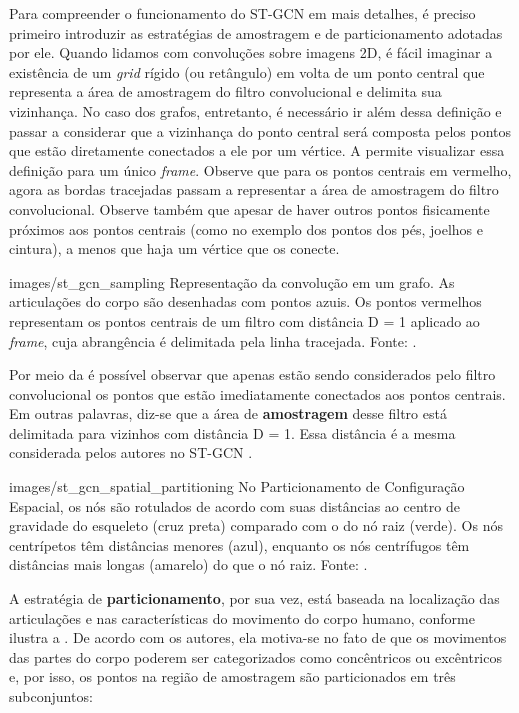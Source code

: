 Para compreender o funcionamento do ST-GCN em mais detalhes, é preciso primeiro introduzir as estratégias de amostragem e de particionamento adotadas por ele. Quando lidamos com convoluções sobre imagens 2D, é fácil imaginar a existência de um \textit{grid} rígido (ou retângulo) em volta de um ponto central que representa a área de amostragem do filtro convolucional e delimita sua vizinhança. No caso dos grafos, entretanto, é necessário ir além dessa definição e passar a considerar que a vizinhança do ponto central será composta pelos pontos que estão diretamente conectados a ele por um vértice. A  permite visualizar essa definição para um único \textit{frame}. Observe que para os pontos centrais em vermelho, agora as bordas tracejadas passam a representar a área de amostragem do filtro convolucional. Observe também que apesar de haver outros pontos fisicamente próximos aos pontos centrais (como no exemplo dos pontos dos pés, joelhos e cintura), a menos que haja um vértice que os conecte.

    {images/st_gcn_sampling}
    {Representação da convolução em um grafo. As articulações do corpo são desenhadas com pontos azuis. Os pontos vermelhos representam os pontos centrais de um filtro com distância D = 1 aplicado ao \textit{frame}, cuja abrangência é delimitada pela linha tracejada. Fonte: \cite[p. 5]{st-gcn-2018}.}

Por meio da  é possível observar que apenas estão sendo considerados pelo filtro convolucional os pontos que estão imediatamente conectados aos pontos centrais. Em outras palavras, diz-se que a área de \textbf{amostragem} desse filtro está delimitada para vizinhos com distância D = 1. Essa distância é a mesma considerada pelos autores no ST-GCN \cite{st-gcn-2018}.

    {images/st_gcn_spatial_partitioning}
    {No Particionamento de Configuração Espacial, os nós são rotulados de acordo com suas distâncias ao centro de gravidade do esqueleto (cruz preta) comparado com o do nó raiz (verde). Os nós centrípetos têm distâncias menores (azul), enquanto os nós centrífugos têm distâncias mais longas (amarelo) do que o nó raiz. Fonte: \cite[p. 5]{st-gcn-2018}.}
    
A estratégia de \textbf{particionamento}, por sua vez,  está baseada na localização das articulações e nas características do movimento do corpo humano, conforme ilustra a . De acordo com os autores, ela motiva-se no fato de que os movimentos das partes do corpo poderem ser categorizados como concêntricos ou excêntricos e, por isso, os pontos na região de amostragem são particionados em três subconjuntos:

